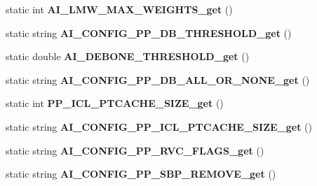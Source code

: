 \begin{DoxyCompactItemize}
\item 
\hypertarget{class_assimp_p_i_n_v_o_k_e_af3a948e39fbd1965a81ee20193700d09}{static int {\bfseries A\+I\+\_\+\+L\+M\+W\+\_\+\+M\+A\+X\+\_\+\+W\+E\+I\+G\+H\+T\+S\+\_\+get} ()}\label{class_assimp_p_i_n_v_o_k_e_af3a948e39fbd1965a81ee20193700d09}

\item 
\hypertarget{class_assimp_p_i_n_v_o_k_e_a1b48d351a51a818f98c6147c870b1de1}{static string {\bfseries A\+I\+\_\+\+C\+O\+N\+F\+I\+G\+\_\+\+P\+P\+\_\+\+D\+B\+\_\+\+T\+H\+R\+E\+S\+H\+O\+L\+D\+\_\+get} ()}\label{class_assimp_p_i_n_v_o_k_e_a1b48d351a51a818f98c6147c870b1de1}

\item 
\hypertarget{class_assimp_p_i_n_v_o_k_e_a0964b7e468b222fb858a57b0339eb64f}{static double {\bfseries A\+I\+\_\+\+D\+E\+B\+O\+N\+E\+\_\+\+T\+H\+R\+E\+S\+H\+O\+L\+D\+\_\+get} ()}\label{class_assimp_p_i_n_v_o_k_e_a0964b7e468b222fb858a57b0339eb64f}

\item 
\hypertarget{class_assimp_p_i_n_v_o_k_e_aa8b04afc3a984ae1722d47c840061f68}{static string {\bfseries A\+I\+\_\+\+C\+O\+N\+F\+I\+G\+\_\+\+P\+P\+\_\+\+D\+B\+\_\+\+A\+L\+L\+\_\+\+O\+R\+\_\+\+N\+O\+N\+E\+\_\+get} ()}\label{class_assimp_p_i_n_v_o_k_e_aa8b04afc3a984ae1722d47c840061f68}

\item 
\hypertarget{class_assimp_p_i_n_v_o_k_e_a5dc3b398ccb87fb5b306ab87013e3d74}{static int {\bfseries P\+P\+\_\+\+I\+C\+L\+\_\+\+P\+T\+C\+A\+C\+H\+E\+\_\+\+S\+I\+Z\+E\+\_\+get} ()}\label{class_assimp_p_i_n_v_o_k_e_a5dc3b398ccb87fb5b306ab87013e3d74}

\item 
\hypertarget{class_assimp_p_i_n_v_o_k_e_a7d9867c5c02e180a3572b11531f513ca}{static string {\bfseries A\+I\+\_\+\+C\+O\+N\+F\+I\+G\+\_\+\+P\+P\+\_\+\+I\+C\+L\+\_\+\+P\+T\+C\+A\+C\+H\+E\+\_\+\+S\+I\+Z\+E\+\_\+get} ()}\label{class_assimp_p_i_n_v_o_k_e_a7d9867c5c02e180a3572b11531f513ca}

\item 
\hypertarget{class_assimp_p_i_n_v_o_k_e_a9986da53d369394f5f9a458469543e91}{static string {\bfseries A\+I\+\_\+\+C\+O\+N\+F\+I\+G\+\_\+\+P\+P\+\_\+\+R\+V\+C\+\_\+\+F\+L\+A\+G\+S\+\_\+get} ()}\label{class_assimp_p_i_n_v_o_k_e_a9986da53d369394f5f9a458469543e91}

\item 
\hypertarget{class_assimp_p_i_n_v_o_k_e_ad91b9db23131e2975753c84947aea252}{static string {\bfseries A\+I\+\_\+\+C\+O\+N\+F\+I\+G\+\_\+\+P\+P\+\_\+\+S\+B\+P\+\_\+\+R\+E\+M\+O\+V\+E\+\_\+get} ()}\label{class_assimp_p_i_n_v_o_k_e_ad91b9db23131e2975753c84947aea252}


\end{DoxyCompactItemize}
